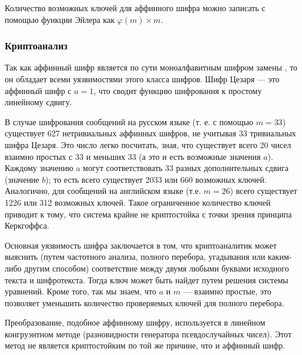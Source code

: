 Количество возможных ключей для аффинного шифра можно записать 
с помощью функции Эйлера как $\varphi(m) \times m$.

\subsubsection{Криптоанализ}

Так как аффинный шифр является по сути моноалфавитным шифром замены
, то он обладает всеми уязвимостями этого класса шифров. Шифр Цезаря —
это аффинный шифр с $a = 1$, что сводит функцию шифрования к простому 
линейному сдвигу.

В случае шифрования сообщений на русском языке (т. е. с помощью $m = 33$) 
существует 627 нетривиальных аффинных шифров, не учитывая 33 тривиальных шифра 
Цезаря. Это число легко посчитать, зная, что существует всего 20 чисел 
взаимно простых с 33 и меньших 33 (а это и есть возможные значения 
$a$). Каждому значению a могут соответствовать 33 разных дополнительных 
сдвига (значение $b$); то есть всего существует 2033 или 660 возможных 
ключей. Аналогично, для сообщений на английском языке (т.е. $m = 26$) 
всего существует 1226 или 312 возможных ключей. Такое ограниченное 
количество ключей приводит к тому, что система крайне не криптостойка 
с точки зрения принципа Керкгоффса.

Основная уязвимость шифра заключается в том, что криптоаналитик может 
выяснить (путем частотного анализа, полного перебора, угадывания или 
каким-либо другим способом) соответствие между двумя любыми буквами 
исходного текста и шифротекста. Тогда ключ может быть найдет путем 
решения системы уравнений. Кроме того, так мы знаем, что $a$ и $m$ — взаимно 
простые, это позволяет уменьшить количество проверяемых ключей для 
полного перебора.

Преобразование, подобное аффинному шифру, используется в линейном 
конгруэнтном методе (разновидности генератора псевдослучайных чисел).
Этот метод не является криптостойким по той же причине, что и аффинный 
шифр.


